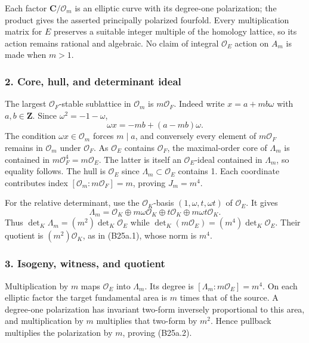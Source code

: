 Each factor \(\mathbf C/\mathcal O_m\) is an elliptic curve with its degree-one polarization; the product gives the asserted principally polarized fourfold. Every multiplication matrix for \(E\) preserves a suitable integer multiple of the homology lattice, so its action remains rational and algebraic. No claim of integral \(\mathcal O_E\) action on \(A_m\) is made when \(m>1\).

\subsubsection{2. Core, hull, and determinant ideal}\label{core-hull-and-determinant-ideal}

The largest \(\mathcal O_F\)-stable sublattice in \(\mathcal O_m\) is \(m\mathcal O_F\). Indeed write \(x=a+mb\omega\) with \(a,b\in\mathbf Z\). Since \(\omega^2=-1-\omega\), \[
 \omega x=-mb+(a-mb)\omega.
\] The condition \(\omega x\in\mathcal O_m\) forces \(m\mid a\), and conversely every element of \(m\mathcal O_F\) remains in \(\mathcal O_m\) under \(\mathcal O_F\). As \(\mathcal O_E\) contains \(\mathcal O_F\), the maximal-order core of \(\Lambda_m\) is contained in \(m\mathcal O_F^4=m\mathcal O_E\). The latter is itself an \(\mathcal O_E\)-ideal contained in \(\Lambda_m\), so equality follows. The hull is \(\mathcal O_E\) since \(\Lambda_m\subset\mathcal O_E\) contains 1. Each coordinate contributes index \([\mathcal O_m:m\mathcal O_F]=m\), proving \(J_m=m^4\).

For the relative determinant, use the \(\mathcal O_K\)-basis \((1,\omega,t,\omega t)\) of \(\mathcal O_E\). It gives \[
 \Lambda_m=\mathcal O_K\oplus m\omega\mathcal O_K
                    \oplus t\mathcal O_K\oplus m\omega t\mathcal O_K.
\] Thus \(\det_K\Lambda_m=(m^2)\det_K\mathcal O_E\) while \(\det_K(m\mathcal O_E)=(m^4)\det_K\mathcal O_E\). Their quotient is \((m^2)\mathcal O_K\), as in (B25a.1), whose norm is \(m^4\).

\subsubsection{3. Isogeny, witness, and quotient}\label{isogeny-witness-and-quotient}

Multiplication by \(m\) maps \(\mathcal O_E\) into \(\Lambda_m\). Its degree is \([\Lambda_m:m\mathcal O_E]=m^4\). On each elliptic factor the target fundamental area is \(m\) times that of the source. A degree-one polarization has invariant two-form inversely proportional to this area, and multiplication by \(m\) multiplies that two-form by \(m^2\). Hence pullback multiplies the polarization by \(m\), proving (B25a.2).


